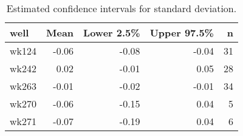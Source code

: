 \begin{table}[ht]
\centering
\begin{tabular}{lrrrr}
  \hline
well & Mean & Lower 2.5\% & Upper 97.5\% & n \\ 
  \hline
wk124 & -0.06 & -0.08 & -0.04 &  31 \\ 
  wk242 & 0.02 & -0.01 & 0.05 &  28 \\ 
  wk263 & -0.01 & -0.02 & -0.01 &  34 \\ 
  wk270 & -0.06 & -0.15 & 0.04 &   5 \\ 
  wk271 & -0.07 & -0.19 & 0.04 &   6 \\ 
   \hline
\end{tabular}
\caption{Estimated confidence intervals for standard deviation.} 
\label{tab:sd}
\end{table}
